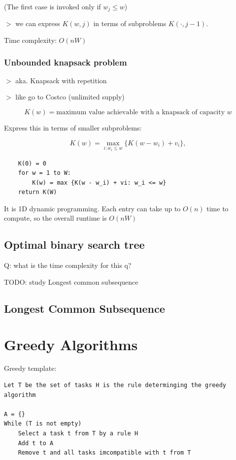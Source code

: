 \documentclass[12pt,a4paper]{article}
\newcommand{\remark}[1]{
    {\small $>$ {\color{blue} #1}}
}
\begin{document}
\begin{center}
(The first case is invoked only if $w_j \leq w$)
\end{center}

\remark{we can express $K(w, j)$ in terms of subproblems $K(\cdot, j - 1)$.}

Time complexity: $O(nW)$

\subsubsection*{Unbounded knapsack problem}

\remark{aka. Knapsack with repetition}

\remark{like go to Costco (unlimited supply)}

\[K(w) = \text{maximum value achievable with a knapsack of capacity } w\]

Express this in terms of smaller subproblems:

\[
K(w) = \max_{i : w_i \leq w} \{ K(w - w_i) + v_i \},
\]

\begin{verbatim}
    K(0) = 0
    for w = 1 to W:
        K(w) = max {K(w - w_i) + vi: w_i <= w}
    return K(W)
\end{verbatim}

It is 1D dynamic programming. Each entry can take up to $O(n)$ time to compute, so the overall runtime is $O(nW)$ 

\subsection*{Optimal binary search tree}

Q: what is the time complexity for this q?

TODO: study Longest common subsequence

\subsection*{Longest Common Subsequence}

\section*{Greedy Algorithms}

Greedy template:
\begin{verbatim}
Let T be the set of tasks H is the rule determinging the greedy algorithm

A = {}
While (T is not empty)
    Select a task t from T by a rule H
    Add t to A
    Remove t and all tasks imcompatible with t from T
\end{verbatim}
\end{document}
